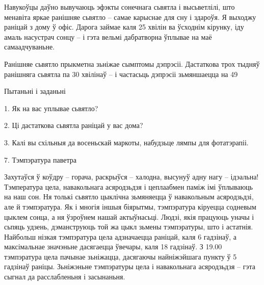 Навукоўцы даўно вывучаюць эфэкты сонечнага сьвятла і высьветлілі, што менавіта яркае ранішняе сьвятло – самае карыснае для сну і здароўя. Я выходжу раніцай з дому ў офіс. Дарога займае каля 25 хвілін ва ўсходнім кірунку, іду амаль насустрач сонцу – і гэта вельмі дабратворна ўплывае на маё самаадчуваньне.

Ранішняе сьвятло прыкметна зьніжае сымптомы дэпрэсіі. Дастаткова трох тыдняў ранішняга сьвятла па 30 хвілінаў – і частасьць дэпрэсіі зьмяншаецца на 49%

Пытаньні і заданьні

1. Як на вас уплывае сьвятло?

2. Ці дастаткова сьвятла раніцай у вас дома?

3. Калі вы схільныя да восеньскай маркоты, набудзьце лямпы для фотатэрапіі.


7. Тэмпэратура паветра

Захутаўся ў коўдру – горача, раскрыўся – халодна, высунуў адну нагу – ідэальна! Тэмпература цела, навакольнага асяродзьдзя і цеплаабмен паміж імі ўплываюць на наш сон. Ня толькі сьвятло цыклічна зьмяняецца ў навакольным асяродзьдзі, але й тэмпэратура. Як і многія іншыя біярытмы, тэмпэратура кіруецца содневым цыклем сонца, а ня ўзроўнем нашай актыўнасьці. Людзі, якія працуюць уначы і сьпяць удзень, дэманструюць той жа цыкл зьмены тэмпэратуры, што і астатнія. Найбольш нізкая тэмпэратура цела адзначаецца раніцай, каля 6 гадзінаў, а максімальнае значэньне дасягаецца ўвечары, каля 18 гадзінаў. З 19.00 тэмпэратура цела пачынае зьніжацца, дасягаючы найніжэйшага пункту ў 5 гадзінаў раніцы. Зьніжэньне тэмпэратуры цела і навакольнага асяродзьдзя – гэта сыгнал да расслабленьня і засынаньня.

